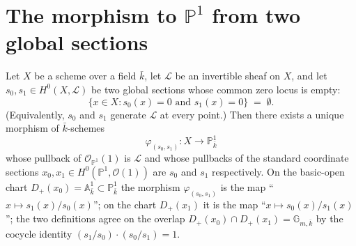 \section{The morphism to \(\mathbb P^1\) from two global sections}
\begin{lemma}


  \label{lem:morphism_to_p1_from_global_sections}
  
  Let \(X\) be a scheme over a field \(\bar k\), let \(\mathcal L\) be an invertible
  sheaf on \(X\), and let \(s_0, s_1 \in H^0(X, \mathcal L)\) be two global
  sections whose common zero locus is empty:
  \[
    \{x \in X : s_0(x) = 0 \text{ and } s_1(x) = 0\} \;=\; \emptyset.
  \]
  (Equivalently, \(s_0\) and \(s_1\) generate \(\mathcal L\) at every point.) Then
  there exists a unique morphism of \(\bar k\)-schemes
  \[
    \varphi_{(s_0, s_1)} \colon X \longrightarrow \mathbb P^1_{\bar k}
  \]
  whose pullback of \(\mathcal O_{\mathbb P^1}(1)\) is \(\mathcal L\) and whose
  pullbacks of the standard coordinate sections $x_0, x_1 \in
  H^0(\mathbb P^1, \mathcal O(1))$ are $s_0$ and $s_1$ respectively. On the
  basic-open chart $D_+(x_0) = \mathbb A^1_{\bar k} \subset
  \mathbb P^1_{\bar k}$ the morphism $\varphi_{(s_0, s_1)}$ is the map ``$x
  \mapsto s_1(x) / s_0(x)$''; on the chart $D_+(x_1)$ it is the map ``$x
  \mapsto s_0(x) / s_1(x)$''; the two definitions agree on the overlap
  \(D_+(x_0) \cap D_+(x_1) = \mathbb G_{m, \bar k}\) by the cocycle identity
  \((s_1 / s_0) \cdot (s_0 / s_1) = 1\).
\end{lemma}
